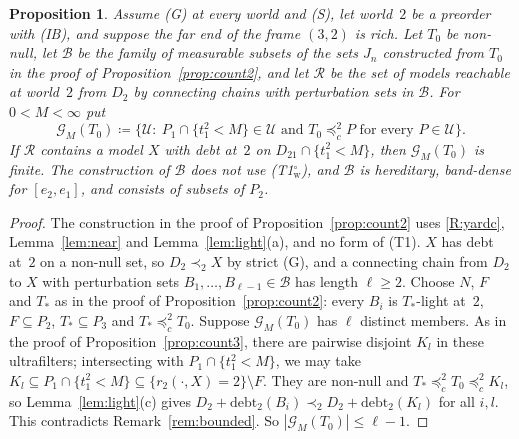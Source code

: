 \documentclass[11pt]{article}
\newtheorem{proposition}[theorem]{Proposition}
\theoremstyle{definition}\newtheorem{definition}[theorem]{Definition}
\theoremstyle{remark}\newtheorem{remark}[theorem]{Remark}
\newcommand{\debt}{\mathrm{debt}}
\newcommand{\Uf}{\mathcal U}
\newcommand{\Bfam}{\mathcal B}
\newcommand{\Tw}{\textup{(T1$^\circ_{\mathrm w}$)}}
\begin{document}
\begin{proposition}\label{prop:bcount}
Assume (G) at every world and (S), let world~$2$ be a preorder with (IB),
and suppose the far end of the frame $(3,2)$ is rich. Let $T_0$ be non-null,
let $\Bfam$ be the family of measurable subsets of the sets $J_n$
constructed from $T_0$ in the proof of Proposition~\ref{prop:count2}, and
let $\mathcal R$ be the set of models reachable at world~$2$ from $D_2$ by
connecting chains with perturbation sets in $\Bfam$. For $0<M<\infty$ put
\[
 \mathcal G_M(T_0)\coloneqq\{\Uf:\ P_1\cap\{t^2_1<M\}\in\Uf\text{ and }
 T_0\preceq^2_cP\text{ for every }P\in\Uf\}.
\]
If $\mathcal R$ contains a model $X$ with debt at~$2$ on
$D_{21}\cap\{t^2_1<M\}$, then $\mathcal G_M(T_0)$ is finite. The
construction of $\Bfam$ does not use \Tw, and $\Bfam$ is hereditary,
band-dense for $[e_2,e_1]$, and consists of subsets of $P_2$.
\end{proposition}
\begin{proof}
The construction in the proof of Proposition~\ref{prop:count2} uses
\ref{R:yardc}, Lemma~\ref{lem:near} and Lemma~\ref{lem:light}(a), and no
form of (T1). $X$ has debt at~$2$ on a non-null set, so $D_2\prec_2X$ by
strict (G), and a connecting chain from $D_2$ to $X$ with perturbation sets
$B_1,\dots,B_{\ell-1}\in\Bfam$ has length $\ell\ge2$. Choose $N$, $F$ and
$T_*$ as in the proof of Proposition~\ref{prop:count2}: every $B_i$ is
$T_*$-light at~$2$, $F\subseteq P_2$, $T_*\subseteq P_3$ and
$T_*\preceq^2_cT_0$. Suppose $\mathcal G_M(T_0)$ has $\ell$ distinct members.
As in the proof of Proposition~\ref{prop:count3}, there are pairwise disjoint
$K_l$ in these ultrafilters; intersecting with $P_1\cap\{t^2_1<M\}$, we may
take $K_l\subseteq P_1\cap\{t^2_1<M\}\subseteq\{r_2(\cdot,X)=2\}\setminus
F$. They are non-null and $T_*\preceq^2_cT_0\preceq^2_cK_l$, so
Lemma~\ref{lem:light}(c) gives $D_2+\debt_2(B_i)\prec_2D_2+\debt_2(K_l)$ for
all $i,l$. This contradicts Remark~\ref{rem:bounded}. So
$|\mathcal G_M(T_0)|\le\ell-1$.
\end{proof}
\end{document}

